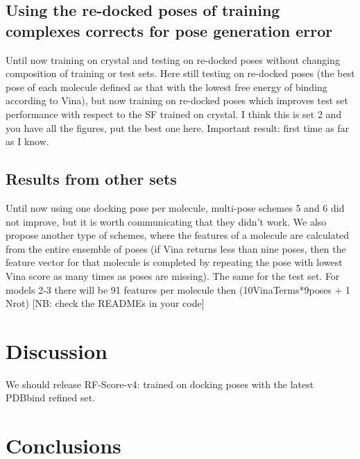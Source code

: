 \documentclass[twocolumn]{bmcart}
\begin{document}
\subsection*{Using the re-docked poses of training complexes corrects for pose generation error}

Until now training on crystal and testing on re-docked poses without changing composition of training or test sets. Here still testing on re-docked poses (the best pose of each molecule defined as that with the lowest free energy of binding according to Vina), but now training on re-docked poses which improves test set performance with respect to the SF trained on crystal. I think this is set 2 and you have all the figures, put the best one here. Important result: first time as far as I know.

\subsection*{Results from other sets}

Until now using one docking pose per molecule, multi-pose schemes 5 and 6 did not improve, but it is worth communicating that they didn’t work. We also propose another type of schemes, where the features of a molecule are calculated from the entire ensemble of poses (if Vina returns less than nine poses, then the feature vector for that molecule is completed by repeating the pose with lowest Vina score as many times as poses are missing). The same for the test set. For models 2-3 there will be 91 features per molecule then (10VinaTerms*9poses + 1 Nrot) [NB: check the READMEs in your code]

\section*{Discussion}

We should release RF-Score-v4: trained on docking poses with the latest PDBbind refined set.

\section*{Conclusions}

\end{document}
